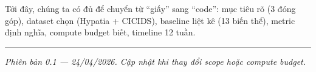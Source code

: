 \documentclass[11pt,a4paper]{article}
\begin{document}
\begin{greenbox}
Tới đây, chúng ta có đủ để chuyển từ ``giấy'' sang ``code'': mục tiêu rõ (3 đóng góp), dataset chọn (Hypatia + CICIDS), baseline liệt kê (13 biến thể), metric định nghĩa, compute budget biết, timeline 12 tuần.
\end{greenbox}

\vspace{0.4cm}
\hrule
\vspace{0.3cm}
\textit{\small Phiên bản 0.1 --- 24/04/2026. Cập nhật khi thay đổi scope hoặc compute budget.}
\end{document}
